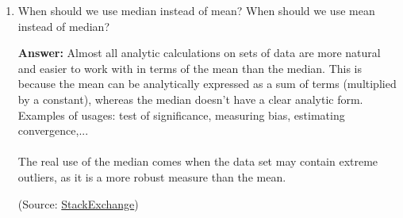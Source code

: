 \documentclass{article}
\newenvironment{QandA}{\begin{enumerate}[label=\arabic*.]}{\end{enumerate}}
\newenvironment{answer}{\par\normalfont \textbf{Answer:}}{}
\begin{document}
\begin{QandA}
    \item When should we use median instead of mean? When should we use mean instead of median?
    \begin{answer}
        Almost all analytic calculations on sets of data are more natural and easier to work with in terms of the mean than the median. This is because the mean can be analytically expressed as a sum of terms (multiplied by a constant), whereas the median doesn't have a clear analytic form. Examples of usages: test of significance, measuring bias, estimating convergence,... \\\\
        The real use of the median comes when the data set may contain extreme outliers, as it is a more robust measure than the mean. 
        
        (Source: \href{https://math.stackexchange.com/questions/2304710/mean-vs-median-when-to-use}{StackExchange})
    \end{answer}


\end{QandA}
\end{document}
